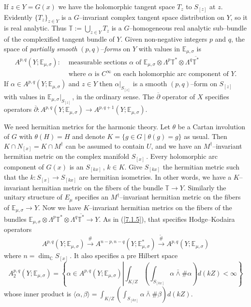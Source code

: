 \documentclass{conm-p-l}
\def\C{\mathbb{C}}
\def\E{\mathbb{E}}
\def\T{\mathbb{T}}
\begin{document}
If $z \in Y = G(x)$ we have the holomorphic tangent space $T_z$ to $S_{[z]}$
at $z$. 
Evidently $\{T_z\}_{z \in Y}$ is a $G$--invariant complex tangent space
distribution on $Y$, so it is real analytic.  Thus 
$\T := \bigcup_{z \in Y} T_z$
is a $G$--homogeneous real analytic sub--bundle of the complexified
tangent bundle of $Y$.  Given non-negative integers $p$ and $q$, the
space of {\em partially smooth} $(p,q)$--{\em forms} on $Y$ with values
in $\E_{\mu,\sigma}$ is 
\begin{equation}\label{8.1.6c}
\begin{aligned}
A^{p,q}(Y;\E_{\mu,\sigma}): &\text{ measurable sections $\alpha$ of }
	\E_{\mu,\sigma}\otimes \Lambda^p\T^* \otimes \Lambda^q\overline{\T^*}\\
&\text{ where $\alpha$ is $C^\infty$ on each holomorphic arc component of $Y$.} 
\end{aligned}
\end{equation}
If $\alpha \in A^{p,q}(Y;\E_{\mu,\sigma})$ and $z \in Y$ then 
$\alpha|_{S_{[z]}}$ is a smooth $(p,q)$--form on $S_{[z]}$ with values in
$\E_{\mu,\sigma}|_{S_{[z]}}$\,, in the ordinary sense.  The
$\overline{\partial}$ operator of $X$ specifies operators
$\overline{\partial}: A^{p,q}(Y;\E_{\mu,\sigma}) \to 
A^{p,q+1}(Y;\E_{\mu,\sigma})$.

We need hermitian metrics for the harmonic theory.  Let $\theta$ be a
Cartan involution of $G$ with $\theta(H) = H$ and denote $K = \{g \in G \mid
\theta(g) = g\}$ as usual.  Then $K \cap N_{[x]} = K \cap M^\dagger$
can be assumed to contain $U$, and we have an $M^\dagger$--invariant hermitian 
metric on the complex manifold $S_{[x]}$\,.  Every holomorphic arc component of
$G(x)$ is an $S_{[kx]}$\,, $k \in K$.  Give $S_{[kx]}$ the hermitian
metric such that the $k: S_{[x]} \to S_{[kx]}$ are hermitian isometries.
In other words, we have a $K$--invariant hermitian metric on the fibers of
the bundle $\T \to Y$.  Similarly the unitary structure of $E_\mu$ specifies
an $M^\dagger$--invariant hermitian metric on the fibers of 
$\E_{\mu,\sigma} \to Y$.  Now we have $K$--invariant hermitian metrics on
the fibers of the bundles $\E_{\mu,\sigma}\otimes \Lambda^p\T^* \otimes
 \Lambda^q\overline{\T^*} \to Y$.  As in (\ref{7.1.5}), that specifies
Hodge--Kodaira operators 
\begin{equation}\label{8.1.7a}
A^{p,q}(Y;\E_{\mu,\sigma}) \overset{\#}{\rightarrow}
	A^{n-p,n-q}(Y;\E^*_{\mu,\sigma}) \overset{\widetilde{\#}}{\rightarrow}
	A^{p,q}(Y;\E_{\mu,\sigma})
\end{equation}
where $n = \dim_\C S_{[x]}$\,.  It also specifies a pre Hilbert space
\begin{equation}\label{8.1.7b}
A_2^{p,q}(Y;\E_{\mu,\sigma}) = \left \{ \alpha \in
	A^{p,q}(Y;\E_{\mu,\sigma}) \left | \int_{K/Z}\left ( \int_{S_{[kx]}}
	\alpha \bar{\wedge} \#\alpha \right ) d(kZ) < \right . \infty \right \}
\end{equation}
whose inner product is $\langle \alpha , \beta \rangle = 
\int_{K/Z}\left ( \int_{S_{[kx]}} \alpha \bar{\wedge} \#\beta\right ) d(kZ)$.
\end{document}
